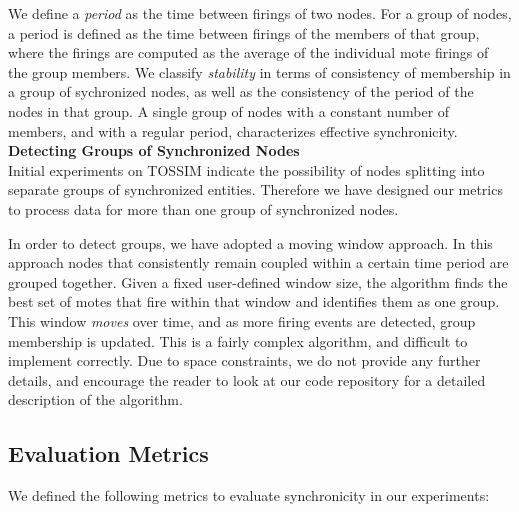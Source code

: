 We define a \emph{period} as the time between firings of two nodes.
For a group of nodes, a period is defined as the time between firings of the
members of that group, where the firings are computed as the
average of the individual mote firings of the group members.
We classify \emph{stability} in terms of consistency of membership 
in a group of sychronized nodes, as well as the consistency of 
the period of the nodes in that group. 
A single group of nodes with a constant number of members, and with a 
regular period, characterizes effective synchronicity. \\

\noindent
{\bf Detecting Groups of Synchronized Nodes} \\
Initial experiments on TOSSIM indicate the possibility
of nodes splitting into separate groups of synchronized entities.
Therefore we have designed our metrics to process data for 
more than one group of synchronized nodes.

In order to detect groups, we have adopted a moving window approach.
In this approach nodes that consistently remain coupled within a certain time period
are grouped together. Given a fixed user-defined window size, the algorithm
finds the best set of motes that fire within that window and 
identifies them as one group. 
This window \emph{moves} over time, and as more firing events are detected, 
group membership is updated.
This is a fairly complex algorithm, and difficult to implement correctly.
Due to space constraints, we do not provide any further details,
and encourage the reader to look at our code repository for a detailed
description of the algorithm.

\subsection{Evaluation Metrics}
We defined the following metrics to evaluate synchronicity in our experiments:

